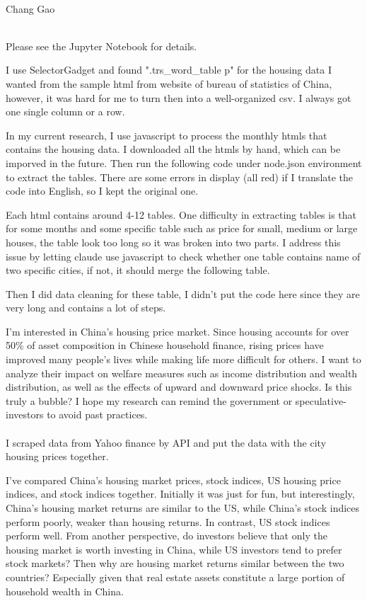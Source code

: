 \documentclass[12pt,letterpaper]{article}
\begin{document}
	\begin{center}
		\smallskip\\
		Chang Gao\smallskip\\
	\end{center}
	\smallskip\\
	Please see the Jupyter Notebook for details.
	
	I use SelectorGadget and found ".trs\_word\_table p" for the housing data I wanted from the sample html from website of bureau of statistics of China, however, it was hard for me to turn then into a well-organized csv. I always got one single column or a row.
	
	In my current research, I use javascript to process the monthly htmls that contains the housing data. I downloaded all the htmls by hand, which can be imporved in the future. Then run the following code under node.json environment to extract the tables. There are some errors in display (all red) if I translate the code into English, so I kept the original one.
	
	Each html contains around 4-12 tables. One difficulty in extracting tables is that for some months and some specific table such as price for small, medium or large houses, the table look too long so it was broken into two parts. I address this issue by letting claude use javascript to check whether one table contains name of two specific cities, if not, it should merge the following table.
	
	Then I did data cleaning for these table, I didn't put the code here since they are very long and contains a lot of steps.
	
	I'm interested in China's housing price market. Since housing accounts for over 50\% of asset composition in Chinese household finance, rising prices have improved many people's lives while making life more difficult for others. I want to analyze their impact on welfare measures such as income distribution and wealth distribution, as well as the effects of upward and downward price shocks. Is this truly a bubble? I hope my research can remind the government or speculative-investors to avoid past practices.\medskip\\
	\smallskip\\
	I scraped data from Yahoo finance by API and put the data with the city housing prices together.
	
	I've compared China's housing market prices, stock indices, US housing price indices, and stock indices together. Initially it was just for fun, but interestingly, China's housing market returns are similar to the US, while China's stock indices perform poorly, weaker than housing returns. In contrast, US stock indices perform well. From another perspective, do investors believe that only the housing market is worth investing in China, while US investors tend to prefer stock markets? Then why are housing market returns similar between the two countries? Especially given that real estate assets constitute a large portion of household wealth in China.
	
\end{document}
